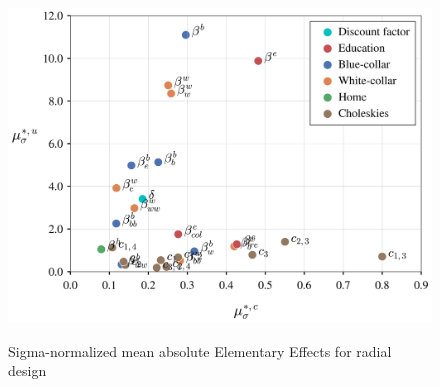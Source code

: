 \documentclass[a4paper,12pt]{article}
\begin{document}
\begin{figure}[H]
	\caption{Sigma-normalized mean absolute Elementary Effects for radial design}
	\centering
	\includegraphics[scale=0.52]{../../../scrypy/figures/scatter_rad}
	\label{fig:rad}
\end{figure}


\newpage

\end{document}
